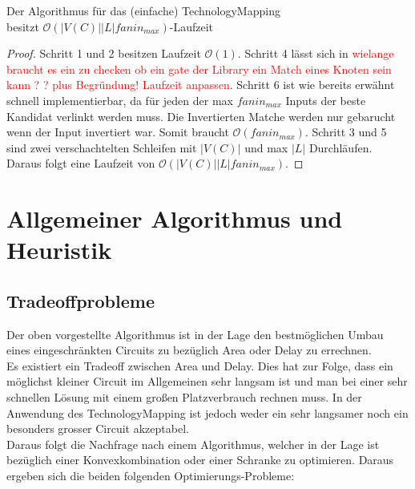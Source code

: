 \documentclass[11pt, a4paper, german]{article}
\newcommand{\TM}{TechnologyMapping }
\begin{document}
\begin{cor}{Der Algorithmus für das (einfache) \TM  \\ besitzt $\mathcal{O}(  |V(C)||L| fanin_{max})$-Laufzeit}
\end{cor}
\begin{proof}
Schritt 1 und 2 besitzen Laufzeit $\mathcal{O}(1)$. Schritt 4 lässt sich in \textcolor{red}{ wielange braucht es ein zu checken ob ein gate der Library ein Match eines Knoten sein kann ? ? plus Begründung! Laufzeit anpassen}. Schritt 6 ist wie bereits erwähnt schnell implementierbar, da für jeden der max $fanin_{max}$ Inputs der beste Kandidat verlinkt werden muss. Die Invertierten Matche werden nur gebarucht wenn der Input invertiert war. Somit braucht $\mathcal{O}(fanin_{max})$. Schritt 3 und 5 sind zwei verschachtelten Schleifen mit  $|V(C)|$ und max $|L|$ Durchläufen. \\
Daraus folgt eine Laufzeit von $\mathcal{O}(  |V(C)||L| fanin_{max})$.
\end{proof}



\newpage
\section{Allgemeiner Algorithmus und Heuristik}
\subsection{Tradeoffprobleme}
Der oben vorgestellte Algorithmus ist in der Lage den bestmöglichen Umbau eines eingeschränkten Circuits zu bezüglich Area oder Delay zu errechnen. \\
Es existiert  ein Tradeoff zwischen Area und Delay. Dies hat zur Folge, dass ein möglichst kleiner Circuit im Allgemeinen sehr langsam ist und man bei einer sehr schnellen Lösung mit einem großen Platzverbrauch rechnen muss. In der Anwendung des \TM ist jedoch weder ein sehr langsamer noch ein besonders grosser Circuit akzeptabel.\\
Daraus folgt die Nachfrage nach einem Algorithmus, welcher in der Lage ist bezüglich einer Konvexkombination oder einer Schranke zu optimieren. Daraus ergeben sich die beiden folgenden Optimierungs-Probleme: \\
\end{document}
